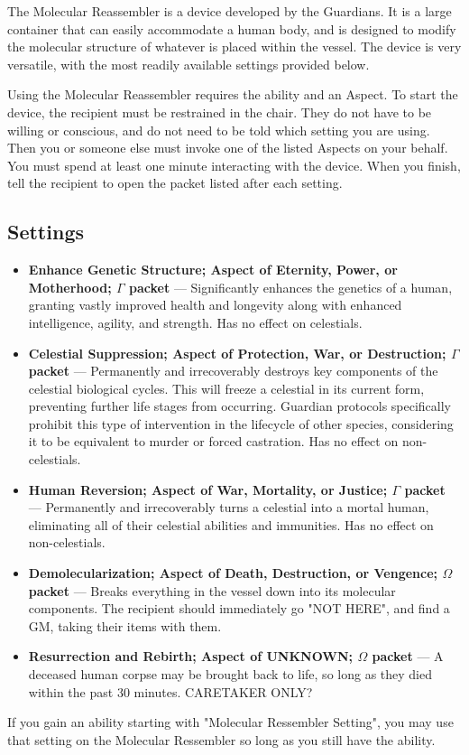 \documentclass[green]{guardians}
\begin{document}
\name{\gReassembler{}}

The Molecular Reassembler is a device developed by the Guardians. It is a large container that can easily accommodate a human body, and is designed to modify the molecular structure of whatever is placed within the vessel. The device is very versatile, with the most readily available settings provided below.

Using the Molecular Reassembler requires the \aGuardianTech{} ability and an Aspect. To start the device, the recipient must be restrained in the chair. They do not have to be willing or conscious, and do not need to be told which setting you are using. Then you or someone else must invoke one of the listed Aspects on your behalf. You must spend at least one minute interacting with the device. When you finish, tell the recipient to open the packet listed after each setting.

\subsection{Settings}

\begin{itemize}
  \item \textbf{Enhance Genetic Structure; Aspect of Eternity, Power, or Motherhood; $\Gamma$ packet} --- Significantly enhances the genetics of a human, granting vastly improved health and longevity along with enhanced intelligence, agility, and strength. Has no effect on celestials.
  \item \textbf{Celestial Suppression; Aspect of Protection, War, or Destruction; $\Gamma$ packet} --- Permanently and irrecoverably destroys key components of the celestial biological cycles. This will freeze a celestial in its current form, preventing further life stages from occurring. Guardian protocols specifically prohibit this type of intervention in the lifecycle of other species, considering it to be equivalent to murder or forced castration. Has no effect on non-celestials.
	\item \textbf{Human Reversion; Aspect of War, Mortality, or Justice; $\Gamma$ packet} --- Permanently and irrecoverably turns a celestial into a mortal human, eliminating all of their celestial abilities and immunities. Has no effect on non-celestials.
	\item \textbf{Demolecularization; Aspect of Death, Destruction, or Vengence; $\Omega$ packet} --- Breaks everything in the vessel down into its molecular components. The recipient should immediately go "NOT HERE", and find a GM, taking their items with them.
		\item \textbf{Resurrection and Rebirth; Aspect of UNKNOWN; $\Omega$ packet} --- A deceased human corpse may be brought back to life, so long as they died within the past 30 minutes. CARETAKER ONLY?
	
\end{itemize}

If you gain an ability starting with "Molecular Ressembler Setting", you may use that setting on the Molecular Ressembler so long as you still have the \aGuardianTech{} ability.
\end{document}
